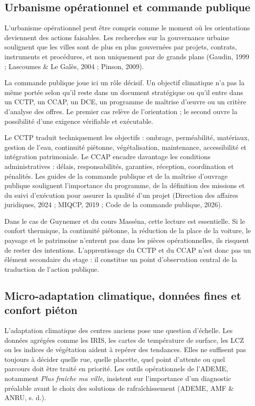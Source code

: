 \documentclass[11pt,a4paper]{report}
\begin{document}
\subsection{Urbanisme opérationnel et commande publique}

L'urbanisme opérationnel peut être compris comme le moment où les orientations deviennent des actions faisables. Les recherches sur la gouvernance urbaine soulignent que les villes sont de plus en plus gouvernées par projets, contrats, instruments et procédures, et non uniquement par de grands plans (Gaudin, 1999 ; Lascoumes \& Le Galès, 2004 ; Pinson, 2009).

La commande publique joue ici un rôle décisif. Un objectif climatique n'a pas la même portée selon qu'il reste dans un document stratégique ou qu'il entre dans un CCTP, un CCAP, un DCE, un programme de maîtrise d'œuvre ou un critère d'analyse des offres. Le premier cas relève de l'orientation ; le second ouvre la possibilité d'une exigence vérifiable et exécutable.

Le CCTP traduit techniquement les objectifs : ombrage, perméabilité, matériaux, gestion de l'eau, continuité piétonne, végétalisation, maintenance, accessibilité et intégration patrimoniale. Le CCAP encadre davantage les conditions administratives : délais, responsabilités, garanties, réception, coordination et pénalités. Les guides de la commande publique et de la maîtrise d'ouvrage publique soulignent l'importance du programme, de la définition des missions et du suivi d'exécution pour assurer la qualité d'un projet (Direction des affaires juridiques, 2024 ; MIQCP, 2019 ; Code de la commande publique, 2026).

Dans le cas de Guynemer et du cours Masséna, cette lecture est essentielle. Si le confort thermique, la continuité piétonne, la réduction de la place de la voiture, le paysage et le patrimoine n'entrent pas dans les pièces opérationnelles, ils risquent de rester des intentions. L'apprentissage du CCTP et du CCAP n'est donc pas un élément secondaire du stage : il constitue un point d'observation central de la traduction de l'action publique.

\subsection{Micro-adaptation climatique, données fines et confort piéton}

L'adaptation climatique des centres anciens pose une question d'échelle. Les données agrégées comme les IRIS, les cartes de température de surface, les LCZ ou les indices de végétation aident à repérer des tendances. Elles ne suffisent pas toujours à décider quelle rue, quelle placette, quel point d'attente ou quel parcours doit être traité en priorité. Les outils opérationnels de l'ADEME, notamment \emph{Plus fraîche ma ville}, insistent sur l'importance d'un diagnostic préalable avant le choix des solutions de rafraîchissement (ADEME, AMF \& ANRU, s. d.).
\end{document}
